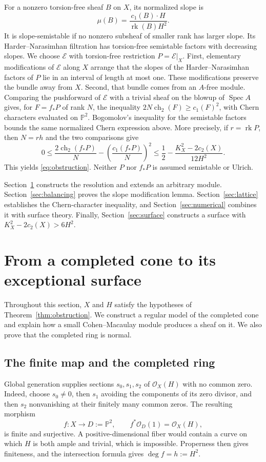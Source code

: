 \documentclass[11pt]{article}
\theoremstyle{remark}
\newcommand{\PP}{\mathbb P}
\newcommand{\cO}{\mathcal O}
\newcommand{\cE}{\mathcal E}
\DeclareMathOperator{\Spec}{Spec}
\DeclareMathOperator{\rk}{rk}
\DeclareMathOperator{\ch}{ch}
\begin{document}
For a nonzero torsion-free sheaf $B$ on $X$, its normalized slope is
\[
 \mu(B)=\frac{c_1(B)\cdot H}{\rk(B)H^2}.
\]
It is slope-semistable if no nonzero subsheaf of smaller rank has larger
slope. Its Harder--Narasimhan filtration has torsion-free semistable
factors with decreasing slopes.
We choose $\cE$ with torsion-free restriction $P=\cE|_X$.
First, elementary modifications of $\cE$ along $X$ arrange that the
slopes of the Harder--Narasimhan factors of $P$ lie in an interval of
length at most one. These modifications preserve the bundle away from
$X$. Second, that bundle comes from an $A$-free module. Comparing the
pushforward of $\cE$ with a trivial sheaf on the blowup of $\Spec A$
gives, for $F=f_*P$ of rank $N$, the inequality
$2N\ch_2(F)\geq c_1(F)^2$, with Chern characters evaluated on $\PP^2$.
Bogomolov's inequality for the semistable factors bounds the same
normalized Chern expression above. More precisely, if $r=\rk P$,
then $N=rh$ and the two comparisons give
\[
 0\leq \frac{2\ch_2(f_*P)}{N}
        -\left(\frac{c_1(f_*P)}{N}\right)^2
 \leq\frac12-\frac{K_X^2-2c_2(X)}{12H^2}.
\]
This yields \eqref{eq:obstruction}. Neither $P$ nor $f_*P$ is
assumed semistable or Ulrich.

Section~\ref{sec:cone} constructs the resolution and extends an arbitrary
module. Section~\ref{sec:balancing} proves the slope modification lemma.
Section~\ref{sec:lattice} establishes the Chern-character inequality,
and Section~\ref{sec:numerical} combines it with surface theory.
Finally, Section~\ref{sec:surface} constructs a surface with
$K_X^2-2c_2(X)>6H^2$.

\section{From a completed cone to its exceptional surface}\label{sec:cone}
Throughout this section, $X$ and $H$ satisfy the hypotheses of
Theorem~\ref{thm:obstruction}. We construct a regular model of the
completed cone and explain how a small Cohen--Macaulay module produces a
sheaf on it. We also prove that the completed ring is normal.

\subsection{The finite map and the completed ring}
Global generation supplies sections $s_0,s_1,s_2$ of $\cO_X(H)$ with no
common zero. Indeed, choose $s_0\ne0$, then $s_1$ avoiding the components
of its zero divisor, and then $s_2$ nonvanishing at their finitely many
common zeros. The resulting morphism
\[
 f:X\longrightarrow D:=\PP^2,\qquad f^*\cO_D(1)=\cO_X(H),
\]
is finite and surjective. A positive-dimensional fiber would contain a
curve on which $H$ is both ample and trivial, which is impossible.
Properness then gives finiteness, and the intersection formula gives
$\deg f=h:=H^2$.
\end{document}
